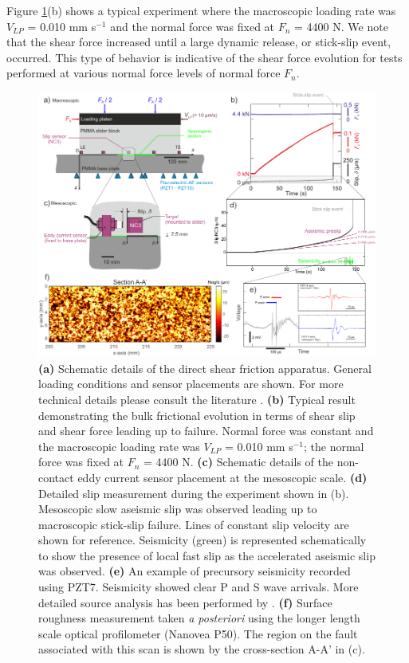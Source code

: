 \documentclass[draft]{agujournal2019}
\begin{document}
 Figure \ref{fig1}(b) shows a typical experiment where the macroscopic loading rate was $V_{LP}$  = 0.010 mm s$^{-1}$ and the normal force was fixed at $F_{n}$ = 4400 N.   We note that the shear force increased until a large dynamic release, or stick-slip event, occurred.  This type of behavior is indicative of the shear force evolution for tests performed at various normal force levels of normal force $F_{n}$. 
 
 \begin{figure}
 	\centering
 	\includegraphics{FIG1.pdf} 
 	\caption{ \textbf{(a)} Schematic details of the direct shear friction apparatus. General loading conditions and sensor placements are shown. For more technical details please consult the literature \cite{Selvadurai2015, Selvadurai2015a}. \textbf{(b)} Typical result demonstrating the bulk frictional evolution in terms of shear slip and shear force leading up to failure. Normal force was constant and the macroscopic loading rate was $V_{LP}$  = 0.010 mm s$^{-1}$; the normal force was fixed at $F_{n}$ = 4400 N. \textbf{(c)} Schematic details of the non-contact eddy current sensor placement at the mesoscopic scale. \textbf{(d)} Detailed slip measurement during the experiment shown in (b).  Mesoscopic slow aseismic slip was observed leading up to macroscopic stick-slip failure.  Lines of constant slip velocity are shown for reference.  Seismicity (green) is represented schematically to show the presence of local fast slip as the accelerated aseismic slip was observed. \textbf{(e)}  An example of precursory seismicity recorded using PZT7.  Seismicity showed clear P and S wave arrivals. More detailed source analysis has been performed by . \textbf{(f)} Surface roughness measurement taken \textit{a posteriori} using the longer length scale optical profilometer (Nanovea P50).  The region on the fault associated with this scan is shown by the cross-section A-A’ in (c).}
 	\label{fig1}
 \end{figure}
 
\end{document}
